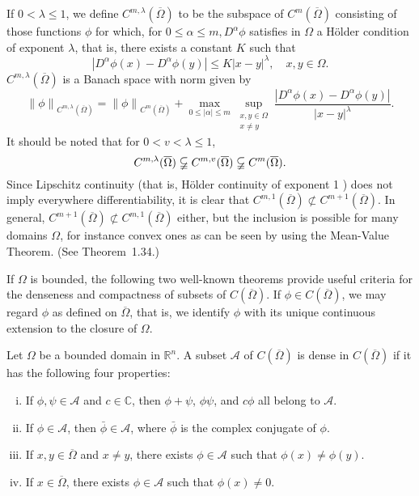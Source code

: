 \begin{para}
  If $0<\lambda \leq 1$, we define $C^{m, \lambda}(\overline{\Omega})$ to be the subspace of $C^m(\overline{\Omega})$ consisting of those functions $\phi$ for which, for $0 \leq \alpha \leq m, D^\alpha \phi$ satisfies in $\Omega$ a Hölder condition of exponent $\lambda$, that is, there exists a constant $K$ such that
  \[
  \left|D^\alpha \phi(x)-D^\alpha \phi(y)\right| \leq K|x-y|^\lambda, \quad x, y \in \Omega .
  \]
  $C^{m, \lambda}(\overline{\Omega})$ is a Banach space with norm given by
  \[
  \left\|\phi\right\|_{C^{m, \lambda}(\overline{\Omega})}=\left\|\phi\right\|_{C^m(\overline{\Omega})}+\max _{0 \leq|\alpha| \leq m} \sup _{\substack{x, y \in \Omega \\ x \neq y}} \frac{\left|D^\alpha \phi(x)-D^\alpha \phi(y)\right|}{|x-y|^\lambda} .
  \]
  It should be noted that for $0<v<\lambda \leq 1$,
  \[
  C^{m, \lambda}(\overline{\Omega}) \varsubsetneqq C^{m, v}(\overline{\Omega}) \varsubsetneqq C^m(\overline{\Omega}) .
  \]
  Since Lipschitz continuity (that is, Hölder continuity of exponent 1 ) does not imply everywhere differentiability, it is clear that $C^{m, 1}(\overline{\Omega}) \not \subset C^{m+1}(\overline{\Omega})$. In general, $C^{m+1}(\overline{\Omega}) \not \subset C^{m, 1}(\overline{\Omega})$ either, but the inclusion is possible for many domains $\Omega$, for instance convex ones as can be seen by using the Mean-Value Theorem. (See Theorem~1.34.)
\end{para}

\begin{para}
  If $\Omega$ is bounded, the following two well-known theorems provide useful criteria for the denseness and compactness of subsets of $C(\overline{\Omega})$. If $\phi \in C(\overline{\Omega})$, we may regard $\phi$ as defined on $\overline{\Omega}$, that is, we identify $\phi$ with its unique continuous extension to the closure of $\Omega$.
\end{para}

\begin{theorem}
  Let $\Omega$ be a bounded domain in $\mathbb{R}^n$. A subset $\mathscr{A}$ of $C(\overline{\Omega})$ is dense in $C(\overline{\Omega})$ if it has the following four properties:
  \begin{enumerate}[(i)]
    \item If $\phi, \psi \in \mathscr{A}$ and $c \in \mathbb{C}$,
      then $\phi+\psi$, $\phi\psi$, and $c \phi$ all belong to $\mathscr{A}$.
    \item If $\phi \in \mathscr{A}$, then $\bar{\phi} \in \mathscr{A}$,
      where $\bar{\phi}$ is the complex conjugate of $\phi$.
    \item If $x, y \in \overline{\Omega}$ and $x \neq y$,
      there exists $\phi \in \mathscr{A}$ such that $\phi(x) \neq \phi(y)$.
    \item If $x \in \overline{\Omega}$, there exists $\phi \in \mathscr{A}$ 
      such that $\phi(x) \neq 0$.
  \end{enumerate}
\end{theorem}

